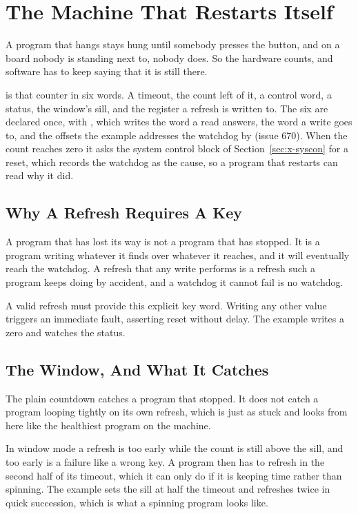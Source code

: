 \section{The Machine That Restarts Itself}
\label{sec:x-wdog}

A program that hangs stays hung until somebody presses the button, and
on a board nobody is standing next to, nobody does. So the hardware
counts, and software has to keep saying that it is still there.

 is that counter in six words. A timeout, the count left of
it, a control word, a status, the window's sill, and the register a
refresh is written to. The six are declared once, with ,
which writes the word a read answers, the word a write goes to, and
the offsets the example addresses the watchdog by (issue 670).
When the count reaches zero it asks the system control block of Section~\ref{sec:x-syscon} for a reset, which records
the watchdog as the cause, so a program that restarts can read why it
did.

\subsection{Why A Refresh Requires A Key}

A program that has lost its way is not a program that has stopped. It
is a program writing whatever it finds over whatever it reaches, and
it will eventually reach the watchdog. A refresh that any write
performs is a refresh such a program keeps doing by accident, and a
watchdog it cannot fail is no watchdog.

A valid refresh must provide this explicit key word. Writing any other
value triggers an immediate fault, asserting reset without delay. The
example writes a zero and watches the status.

\subsection{The Window, And What It Catches}

The plain countdown catches a program that stopped. It does not catch
a program looping tightly on its own refresh, which is just as stuck
and looks from here like the healthiest program on the machine.

In window mode a refresh is too early while the count is still above
the sill, and too early is a failure like a wrong key. A program then
has to refresh in the second half of its timeout, which it can only do
if it is keeping time rather than spinning. The example sets the sill
at half the timeout and refreshes twice in quick succession, which is
what a spinning program looks like.

